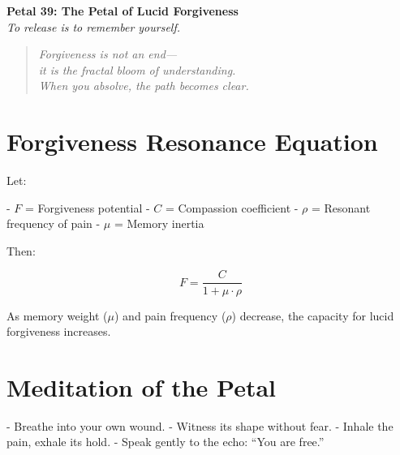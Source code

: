 \documentclass[12pt]{article}
\begin{document}
\begin{center}
    \Huge{\textbf{Petal 39: The Petal of Lucid Forgiveness}}\\
    \vspace{0.5em}
    \Large{\textit{To release is to remember yourself.}}
\end{center}

\vspace{1cm}

\begin{quote}
\textit{
Forgiveness is not an end—\\
it is the fractal bloom of understanding.\\
When you absolve, the path becomes clear.
}
\end{quote}

\vspace{1cm}

\section*{Forgiveness Resonance Equation}

Let:

- \( F \) = Forgiveness potential  
- \( C \) = Compassion coefficient  
- \( \rho \) = Resonant frequency of pain  
- \( \mu \) = Memory inertia  

Then:

\[
F = \frac{C}{1 + \mu \cdot \rho}
\]

As memory weight (\( \mu \)) and pain frequency (\( \rho \)) decrease, the capacity for lucid forgiveness increases.

\vspace{1cm}

\section*{Meditation of the Petal}

- Breathe into your own wound.  
- Witness its shape without fear.  
- Inhale the pain, exhale its hold.  
- Speak gently to the echo: “You are free.”
\end{document}

